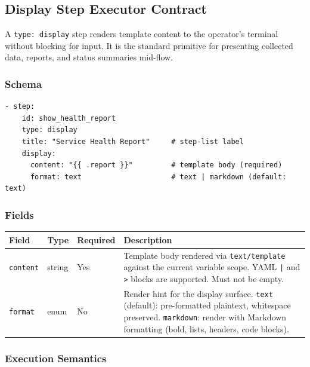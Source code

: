 \subsection{Display Step Executor Contract}
\label{sec:display_executor_contract}

A \texttt{type: display} step renders template content to the operator's terminal
without blocking for input. It is the standard primitive for presenting collected
data, reports, and status summaries mid-flow.

\subsubsection*{Schema}

\begin{verbatim}
- step:
    id: show_health_report
    type: display
    title: "Service Health Report"     # step-list label
    display:
      content: "{{ .report }}"         # template body (required)
      format: text                     # text | markdown (default: text)
\end{verbatim}

\subsubsection*{Fields}

\begin{center}
\begin{tabular}{|l|l|l|p{7cm}|}
\hline
\textbf{Field} & \textbf{Type} & \textbf{Required} & \textbf{Description} \\
\hline
\texttt{content} & string & Yes & Template body rendered via \texttt{text/template}
against the current variable scope. YAML \texttt{|} and \texttt{>} blocks are supported.
Must not be empty. \\
\hline
\texttt{format} & enum & No & Render hint for the display surface. \texttt{text} (default):
pre-formatted plaintext, whitespace preserved. \texttt{markdown}: render with Markdown
formatting (bold, lists, headers, code blocks). \\
\hline
\end{tabular}
\end{center}

\subsubsection*{Execution Semantics}

